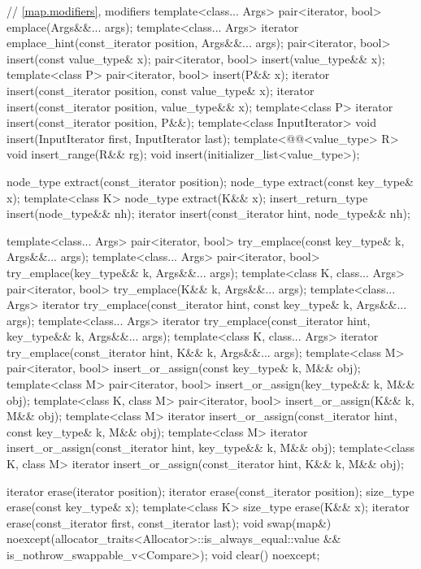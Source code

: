\begin{codeblock}
{{    // \ref{map.modifiers}, modifiers
    template<class... Args> pair<iterator, bool> emplace(Args&&... args);
    template<class... Args> iterator emplace_hint(const_iterator position, Args&&... args);
    pair<iterator, bool> insert(const value_type& x);
    pair<iterator, bool> insert(value_type&& x);
    template<class P> pair<iterator, bool> insert(P&& x);
    iterator insert(const_iterator position, const value_type& x);
    iterator insert(const_iterator position, value_type&& x);
    template<class P>
      iterator insert(const_iterator position, P&&);
    template<class InputIterator>
      void insert(InputIterator first, InputIterator last);
    template<@@<value_type> R>
      void insert_range(R&& rg);
    void insert(initializer_list<value_type>);

    node_type extract(const_iterator position);
    node_type extract(const key_type& x);
    template<class K> node_type extract(K&& x);
    insert_return_type insert(node_type&& nh);
    iterator           insert(const_iterator hint, node_type&& nh);

    template<class... Args>
      pair<iterator, bool> try_emplace(const key_type& k, Args&&... args);
    template<class... Args>
      pair<iterator, bool> try_emplace(key_type&& k, Args&&... args);
    template<class K, class... Args>
      pair<iterator, bool> try_emplace(K&& k, Args&&... args);
    template<class... Args>
      iterator try_emplace(const_iterator hint, const key_type& k, Args&&... args);
    template<class... Args>
      iterator try_emplace(const_iterator hint, key_type&& k, Args&&... args);
    template<class K, class... Args>
      iterator try_emplace(const_iterator hint, K&& k, Args&&... args);
    template<class M>
      pair<iterator, bool> insert_or_assign(const key_type& k, M&& obj);
    template<class M>
      pair<iterator, bool> insert_or_assign(key_type&& k, M&& obj);
    template<class K, class M>
      pair<iterator, bool> insert_or_assign(K&& k, M&& obj);
    template<class M>
      iterator insert_or_assign(const_iterator hint, const key_type& k, M&& obj);
    template<class M>
      iterator insert_or_assign(const_iterator hint, key_type&& k, M&& obj);
    template<class K, class M>
      iterator insert_or_assign(const_iterator hint, K&& k, M&& obj);

    iterator  erase(iterator position);
    iterator  erase(const_iterator position);
    size_type erase(const key_type& x);
    template<class K> size_type erase(K&& x);
    iterator  erase(const_iterator first, const_iterator last);
    void      swap(map&)
      noexcept(allocator_traits<Allocator>::is_always_equal::value &&
               is_nothrow_swappable_v<Compare>);
    void      clear() noexcept;

}}
\end{codeblock}
